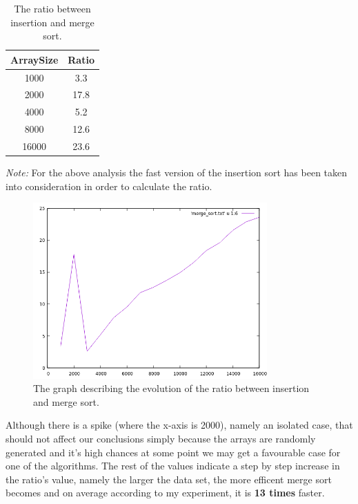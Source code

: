 \documentclass[a4paper,11pt]{article}
\begin{document}
\begin{table}[h!]
    \centering
    \begin{tabular}{||c c||} 
    \hline
    ArraySize & Ratio \\
    \hline
    1000 & 3.3 \\
    2000 & 17.8 \\ 
    4000 & 5.2 \\ 
    8000 & 12.6 \\ 
    16000 & 23.6 \\ [0.5ex]
    \hline
    \hline
    \end{tabular}
    \caption{The ratio between insertion and merge sort.} 
    \label{table:2}
\end{table}

\textit{Note: } For the above analysis the fast version of the insertion sort has been taken into
consideration in order to calculate the ratio.

\begin{figure}[ht]
    \centering
    \includegraphics[width=0.8\textwidth]{merge_sorted_ratio.png}
    \caption{The graph describing the evolution of the ratio between insertion and merge sort.}
    \label{fig:1}
\end{figure}

Although there is a spike (where the x-axis is 2000), namely an isolated case, that should not affect our conclusions
simply because the arrays are randomly generated and it's high chances at some point we may get a favourable case for one of the algorithms. 
The rest of the values indicate a step by step increase in the ratio's value, namely the larger the data set, the more efficent merge sort becomes and 
on average according to my experiment, it is \textbf{13 times} faster.
\end{document}
